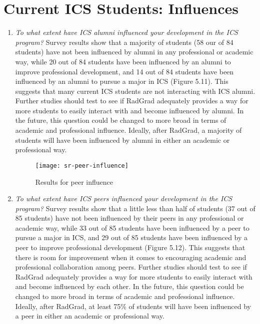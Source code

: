 \section{Current ICS Students: Influences}
\begin{enumerate}
\begin{figure}[h]
\centering
\texttt{[image: sr-alumni-influence]}
\caption{Results for alumni influence}
\end{figure}
\item \textit{To what extent have ICS alumni influenced your development in the ICS program?}
Survey results show that a majority of students (58 our of 84 students) have not been influenced by alumni in any professional or academic way, while 20 out of 84 students have been influenced by an alumni to improve professional development, and 14 out of 84 students have been influenced by an alumni to pursue a major in ICS (Figure 5.11). This suggests that many current ICS students are not interacting with ICS alumni. Further studies should test to see if RadGrad adequately provides a way for more students to easily interact with and become influenced by alumni. In the future, this question could be changed to more broad in terms of academic and professional influence. Ideally, after RadGrad, a majority of students will have been influenced by alumni in either an academic or professional way.   
\begin{figure}[h]
\centering
\texttt{[image: sr-peer-influence]}
\caption{Results for peer influence}
\end{figure}
\item \textit{To what extent have ICS peers influenced your development in the ICS program?}
Survey results show that a little less than half of students (37 out of 85 students) have not been influenced by their peers in any professional or academic way, while 33 out of 85 students have been influenced by a peer to pursue a major in ICS, and 29 out of 85 students have been influenced by a peer to improve professional development (Figure 5.12). This suggests that there is room for improvement when it comes to encouraging academic and professional collaboration among peers. Further studies should test to see if RadGrad adequately provides a way for more students to easily interact with and become influenced by each other. In the future, this question could be changed to more broad in terms of academic and professional influence. Ideally, after RadGrad, at least 75\% of students will have been influenced by a peer in either an academic or professional way. 

\end{enumerate}
